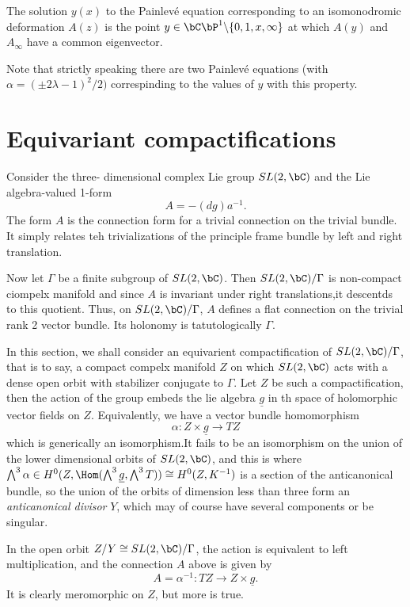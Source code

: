 \begin{prop}\label{art7-proposition-1}
The solution $y(x)$ to the Painlev\'e equation corresponding to an isomonodromic deformation $A(z)$ is the point $y \in \bC\bP^{1} \backslash \{ 0,1,\break x, \infty\}$ at which $A(y)$ and $A_{\infty}$ have a common eigenvector.
\end{prop}

Note that strictly speaking there are two Painlev\'e equations (with $\alpha = (\pm 2\lambda -1)^{2}/2)$ correspinding to the values of $y$ with this property.

\section{Equivariant compactifications}\label{art7-sec-3}

Consider the three- dimensional complex Lie group $SL(2, \bC)$ and the Lie algebra-valued 1-form
$$
A = -(dg)a^{-1}.
$$
The form $A$ is the connection form for a trivial connection on the trivial bundle. It simply relates teh trivializations of the principle frame bundle by left and right translation.

Now let $\Gamma$ be a finite subgroup of $SL(2, \bC)$. Then $SL(2, \bC)/\Gamma$ is non-compact ciompelx manifold and since $A$ is invariant under right translations,it descentds to this quotient. Thus, on $SL(2, \bC)/\Gamma$, $A$ defines a flat connection on the trivial rank 2 vector bundle. Its holonomy is tatutologically $\Gamma$.

In this section, we shall consider an equivarient compactification of $SL(2, \bC)/\Gamma$,  that is to say, a compact compelx manifold $Z$ on which $SL(2, \bC)$ acts with a dense open orbit with stabilizer conjugate to $\Gamma$. Let $Z$ be such a compactification, then the action of the group embeds the lie algebra $\underline{g}$  in th space of holomorphic vector fields on $Z$. Equivalently, we have a vector bundle homomorphism
$$
\alpha: Z \times \underline{g} \rightarrow TZ
$$
which is generically an isomorphism.It fails to be an isomorphism on the union of the lower dimensional orbits of $SL(2, \bC)$, and this is where $\bigwedge^{3} \alpha \in H^{0}(Z, \Hom(\bigwedge^{3} \underline{g}, \bigwedge^{3}T)) \cong H^{0}(Z, K^{-1})$ is a section of the anticanonical bundle, so the union of the orbits of dimension less than three form an \textit{anticanonical divisor} $Y$, which may of course have several components or be singular.

 In the open orbit $Z/Y \cong SL(2, \bC)/\Gamma$, the action is equivalent to left multiplication, and the connection $A$ above is given by
 $$
 A = \alpha^{-1}: TZ \rightarrow  Z \times \underline{g}.
 $$
It is clearly meromorphic on $Z$, but more is true.


